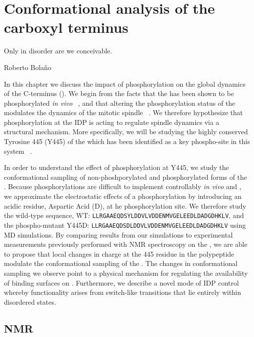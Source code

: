\chapter{Conformational analysis of the \tub carboxyl terminus}

\epigraph{Only in disorder are we conceivable.}{Roberto Bola\~no}

In this chapter we discuss the impact of phosphorylation on the global dynamics of the \tub C-terminus (\gct). We begin from the facts that the \gct has been shown to be phosphorylated {\it in vivo} ~\cite{keck2011cell}, and that altering the phosphorylation status of the \gct modulates the dynamics of the mitotic spindle ~\cite{vogel2001phosphorylation}. We therefore hypothesize that phosphorylation at the \gct IDP is acting to regulate spindle dynamics via a structural mechanism. More specifically, we will be studying the highly conserved Tyrosine 445 (Y445) of the \gct which has been identified as a key phospho-site in this system ~\cite{vogel2001phosphorylation}. 

In order to understand the effect of phosphorylation at Y445, we study the conformational sampling of non-phoshporylated and phosphorylated forms of the \gct. Because phosphorylations are difficult to implement controllably {\it in vivo} and \vitro, we approximate the electrostatic effects of a phosphorylation by introducing an acidic residue, Aspartic Acid (D), at he phosphorylation site. We therefore study the wild-type sequence, WT: \texttt{LLRGAAEQDSYLDDVLVDDENMVGELEEDLDADGDHKLV}, and the phospho-mutant Y445D: \texttt{LLRGAAEQDSDLDDVLVDDENMVGELEEDLDADGDHKLV} using MD simulations. By comparing results from our simulations to experimental measurements previously performed with NMR spectroscopy on the \gct, we are able to propose that local changes in charge at the 445 residue in the polypeptide modulate the conformational sampling of the \gct. The changes in conformational sampling we observe point to a physical mechanism for regulating the availability of binding surfaces on \tub. Furthermore, we describe a novel mode of IDP control whereby functionality arises from switch-like transitions that lie entirely within disordered states.

\section{NMR}

